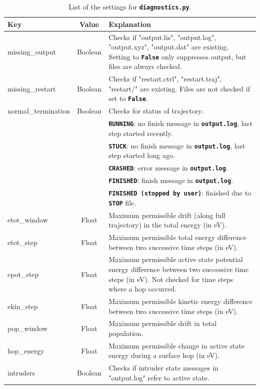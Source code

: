 \documentclass[a4paper,10pt,DIV=15,openany,twoside=false]{scrbook}
\newcommand{\ttt}[1]{\textbf{\texttt{#1}}}
\begin{document}
\begin{table}
  \centering
  \caption{List of the settings for \ttt{diagnostics.py}.}
  \label{tab:diagnostics}
  \begin{tabular}{>{\ttfamily}lcp{11cm}}
    \toprule
    Key  &Value     &Explanation\\
    \midrule
    missing\_output     &Boolean        &Checks if "output.lis", "output.log", "output.xyz", "output.dat" are existing. Setting to \ttt{False} only suppresses output, but files are always checked.\\
    missing\_restart    &Boolean        &Checks if "restart.ctrl", "restart.traj", "restart/" are existing. Files are not checked if set to \ttt{False}.\\
    normal\_termination &Boolean        &Checks for status of trajectory:\\
                                       &&\ttt{RUNNING}: no finish message in \ttt{output.log}, last step started recently.\\
                                       &&\ttt{STUCK}: no finish message in \ttt{output.log}, last step started long ago.\\
                                       &&\ttt{CRASHED}: error message in \ttt{output.log}.\\
                                       &&\ttt{FINISHED}: finish message in \ttt{output.log}.\\
                                       &&\ttt{FINISHED (stopped by user)}: finished due to \ttt{STOP} file.\\
    etot\_window        &Float          &Maximum permissible drift (along full trajectory) in the total energy (in eV).\\
    etot\_step          &Float          &Maximum permissible total energy difference between two successive time steps (in eV).\\
    epot\_step          &Float          &Maximum permissible active state potential energy difference between two successive time steps (in eV). Not checked for time steps where a hop occurred.\\
    ekin\_step          &Float          &Maximum permissible kinetic energy difference between two successive time steps (in eV).\\
    pop\_window         &Float          &Maximum permissible drift in total population.\\
    hop\_energy         &Float          &Maximum permissible change in active state energy during a surface hop (in eV).\\
    intruders           &Boolean        &Checks if intruder state messages in "output.log" refer to active state.\\
    \bottomrule
  \end{tabular}
\end{table}
\end{document}
